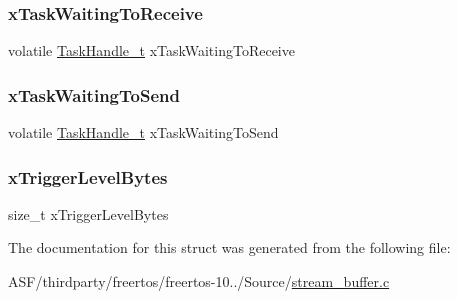 \mbox{\label{structx_s_t_r_e_a_m___b_u_f_f_e_r_aae9dce0a57e217492d5511b8f728d165}} 
\subsubsection{\texorpdfstring{xTaskWaitingToReceive}{xTaskWaitingToReceive}}
{\footnotesize\ttfamily volatile \mbox{\hyperlink{task_8h_ae95f44d4cfeb4a599c6cc258d241cb6b}{Task\+Handle\+\_\+t}} x\+Task\+Waiting\+To\+Receive}

\mbox{\label{structx_s_t_r_e_a_m___b_u_f_f_e_r_adcac505e0e57d53096673aae517ba651}} 
\subsubsection{\texorpdfstring{xTaskWaitingToSend}{xTaskWaitingToSend}}
{\footnotesize\ttfamily volatile \mbox{\hyperlink{task_8h_ae95f44d4cfeb4a599c6cc258d241cb6b}{Task\+Handle\+\_\+t}} x\+Task\+Waiting\+To\+Send}

\mbox{\label{structx_s_t_r_e_a_m___b_u_f_f_e_r_a9cc97a6ea4374a84aa4d1453459ffce4}} 
\subsubsection{\texorpdfstring{xTriggerLevelBytes}{xTriggerLevelBytes}}
{\footnotesize\ttfamily size\+\_\+t x\+Trigger\+Level\+Bytes}



The documentation for this struct was generated from the following file\+:\begin{DoxyCompactItemize}
\item 
A\+S\+F/thirdparty/freertos/freertos-\/10../\+Source/\mbox{\hyperlink{stream__buffer_8c}{stream\+\_\+buffer.\+c}}\end{DoxyCompactItemize}
